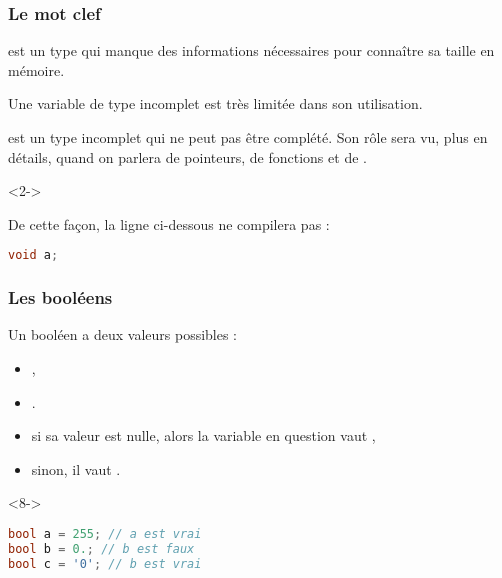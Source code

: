 \documentclass{cppcourses}
\begin{document}
\begin{frame}[fragile]

\frametitle{Le mot clef }

\begin{definition}
 est un type qui manque des informations nécessaires pour connaître sa taille en mémoire.
\end{definition}

Une variable de type incomplet est très limitée dans son utilisation.

 est un type incomplet qui ne peut pas être complété. Son rôle sera vu, plus en détails, quand on parlera de pointeurs, de fonctions et de .

\begin{example}<2->

De cette façon, la ligne ci-dessous ne compilera pas :

\begin{lstlisting}[language = c++]
void a;
\end{lstlisting}

\end{example}

\end{frame}

\begin{frame}[fragile]

\frametitle{Les booléens}

Un booléen a deux valeurs possibles :

\begin{itemize}
    \item<2-> ,
    \item<3-> .
\end{itemize}


\begin{itemize}
    \item<5-> si sa valeur est nulle, alors la variable en question vaut ,
    \item<6-> sinon, il vaut .
\end{itemize}


\begin{example}<8->
    \begin{lstlisting}[language = c++]
bool a = 255; // a est vrai
bool b = 0.; // b est faux
bool c = '0'; // b est vrai
    \end{lstlisting}
\end{example}

\end{frame}
\end{document}
